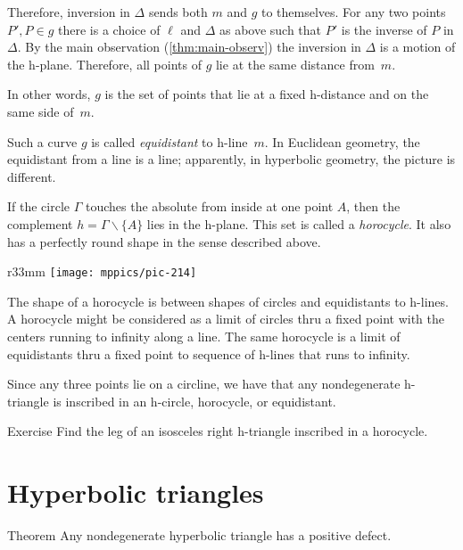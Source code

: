 Therefore, inversion in $\Delta$ sends both $m$ and $g$ to themselves.
For any two points $P',P\in g$ there is a choice of $\ell$ and $\Delta$ as above such that
$P'$ is the inverse of $P$ in $\Delta$.
By the main observation (\ref{thm:main-observ}) the inversion in $\Delta$ is a motion of the h-plane. Therefore, all points of $g$ lie at the same distance from~$m$.

In other words, $g$ is the set of points that lie at a fixed h-distance and on the same side of~$m$.



Such a curve $g$ is called 
\emph{equidistant} to h-line~$m$.
In Euclidean geometry, the equidistant from a line is a line;
apparently, in hyperbolic geometry, the picture is different.

If the circle $\Gamma$ touches the absolute from inside at one point $A$, then the complement $h=\Gamma\backslash\{A\}$ lies in the h-plane.
This set is called a \emph{horocycle}.
It also has a perfectly round shape in the sense described above.


\begin{wrapfigure}{r}{33mm}
\vskip-6mm
\centering
\texttt{[image: mppics/pic-214]}
\end{wrapfigure}

The shape of a horocycle is between shapes of circles and equidistants to h-lines.
A horocycle might be considered as a limit of circles 
thru a fixed point
with the centers running to infinity along a line.
The same horocycle is a limit of equidistants thru a fixed point to sequence of h-lines that runs to infinity.

Since any three points lie on a circline, we have that any nondegenerate h-triangle is inscribed in an h-circle, horocycle, or equidistant.

\begin{thm}{Exercise}\label{ex:right-trig-horocycle}
Find the leg of an isosceles right h-triangle inscribed in a horocycle.
\end{thm}




\section*{Hyperbolic triangles}

\begin{thm}{Theorem}\label{thm:3sum-h}
Any nondegenerate hyperbolic triangle has a positive defect.
\end{thm}


